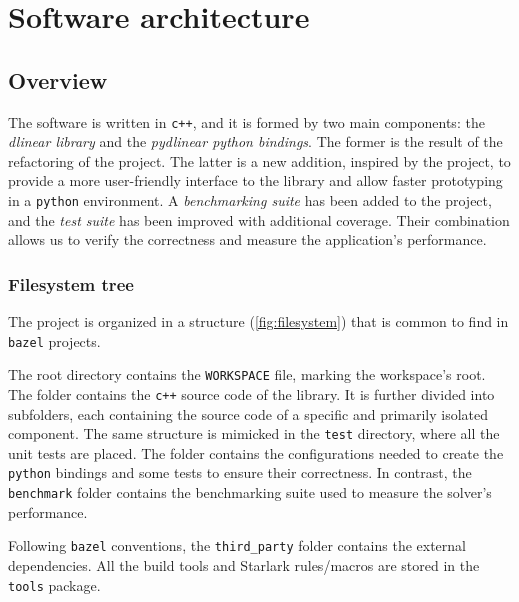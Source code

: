 \chapter{Software architecture}

\section{Overview}

The software is written in \texttt{c++}, and it is formed by two main components: the \textit{dlinear library} and the \textit{pydlinear python bindings}.
The former is the result of the refactoring of the \dlinearfour project.
The latter is a new addition, inspired by the \dreal project, to provide a more user-friendly interface to the library and allow faster prototyping in a \texttt{python} environment.
A \textit{benchmarking suite} has been added to the project, and the \textit{test suite} has been improved with additional coverage.
Their combination allows us to verify the correctness and measure the application's performance.

\subsection*{Filesystem tree}

The project is organized in a structure (\autoref{fig:filesystem}) that is common to find in \texttt{bazel} projects.

The root directory contains the \texttt{WORKSPACE} file, marking the workspace's root.
The \dlinear folder contains the \texttt{c++} source code of the library.
It is further divided into subfolders, each containing the source code of a specific and primarily isolated component.
The same structure is mimicked in the \texttt{test} directory, where all the unit tests are placed.
The \pydlinear folder contains the configurations needed to create the \texttt{python} bindings and some tests to ensure their correctness. In contrast, the \texttt{benchmark} folder contains the benchmarking suite used to measure the solver's performance.

Following \texttt{bazel} conventions, the \texttt{third\_party} folder contains the external dependencies.
All the build tools and Starlark rules/macros are stored in the \texttt{tools} package.


